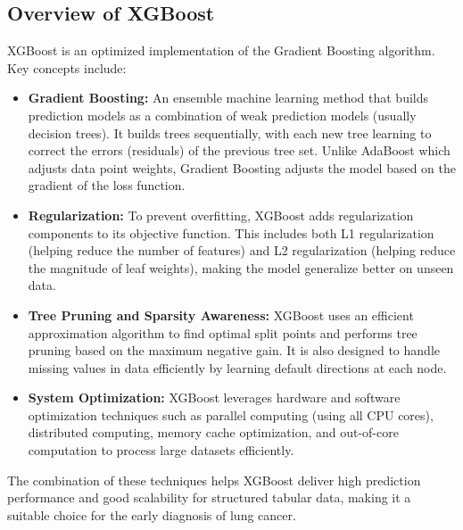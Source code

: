 \subsection{Overview of XGBoost}
XGBoost is an optimized implementation of the Gradient Boosting algorithm. Key concepts include:
\begin{itemize}
    \item \textbf{Gradient Boosting:} An ensemble machine learning method that builds prediction models as a combination of weak prediction models (usually decision trees). It builds trees sequentially, with each new tree learning to correct the errors (residuals) of the previous tree set. Unlike AdaBoost which adjusts data point weights, Gradient Boosting adjusts the model based on the gradient of the loss function.
    \item \textbf{Regularization:} To prevent overfitting, XGBoost adds regularization components to its objective function. This includes both L1 regularization (helping reduce the number of features) and L2 regularization (helping reduce the magnitude of leaf weights), making the model generalize better on unseen data.
    \item \textbf{Tree Pruning and Sparsity Awareness:} XGBoost uses an efficient approximation algorithm to find optimal split points and performs tree pruning based on the maximum negative gain. It is also designed to handle missing values in data efficiently by learning default directions at each node.
    \item \textbf{System Optimization:} XGBoost leverages hardware and software optimization techniques such as parallel computing (using all CPU cores), distributed computing, memory cache optimization, and out-of-core computation to process large datasets efficiently.
\end{itemize}
The combination of these techniques helps XGBoost deliver high prediction performance and good scalability for structured tabular data, making it a suitable choice for the early diagnosis of lung cancer.

